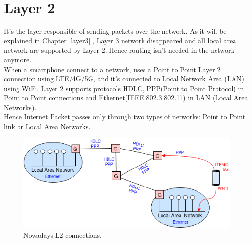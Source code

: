 \chapter{Layer 2}
It's the layer responsible of sending packets over the network. As it will be explained in Chapter \ref{layer3} , Layer 3 network disappeared and all local area network are supported by Layer 2. Hence routing isn't needed in the network anymore.\\
When a smartphone connect to a network, uses a Point to Point Layer 2 connection using LTE/4G/5G, and it's connected to Local Network Area (LAN) using WiFi. Layer 2 supports protocols HDLC, PPP(Point to Point Protocol) in Point to Point connections and Ethernet(IEEE 802.3 802.11) in LAN (Local Area Networks).\\
Hence Internet Packet passes only through two types of networks: Point to Point link or Local Area Networks.
\begin{figure}[h]
\centering
\includegraphics[scale=0.9]{Images/Layer2/layer2}
\caption{\footnotesize{Nowadays L2 connections.}}\label{layer2}
\end{figure}

